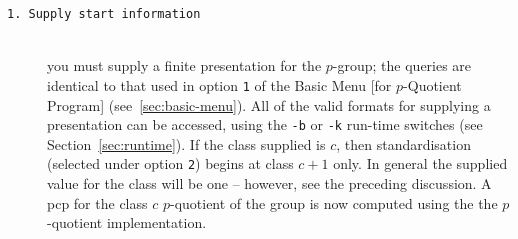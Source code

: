 \documentclass[12pt]{article}
\def\pq{the $p$-quotient implementation}
\begin{document}
\begin{description}
\item[\texttt{1.\ Supply start information}]\ \\
 you must supply a finite presentation
 for the $p$-group; the queries are identical to that used in
 option \texttt{1} of the Basic Menu [for $p$-Quotient Program] 
 (see~\ref{sec:basic-menu}). All of the valid formats for
 supplying a presentation can be accessed, 
 using the \texttt{-b} or \texttt{-k} run-time switches 
 (see Section~\ref{sec:runtime}). 
 If the class supplied is $c$, then standardisation 
 (selected under option \texttt{2}) begins at class $c + 1$ only. 
 In general the supplied value for the class will be one -- 
 however, see the preceding discussion. 
 A pcp for the class $c$ $p$-quotient of the group
 is now computed using the \pq. 


\end{description}
\end{document}
